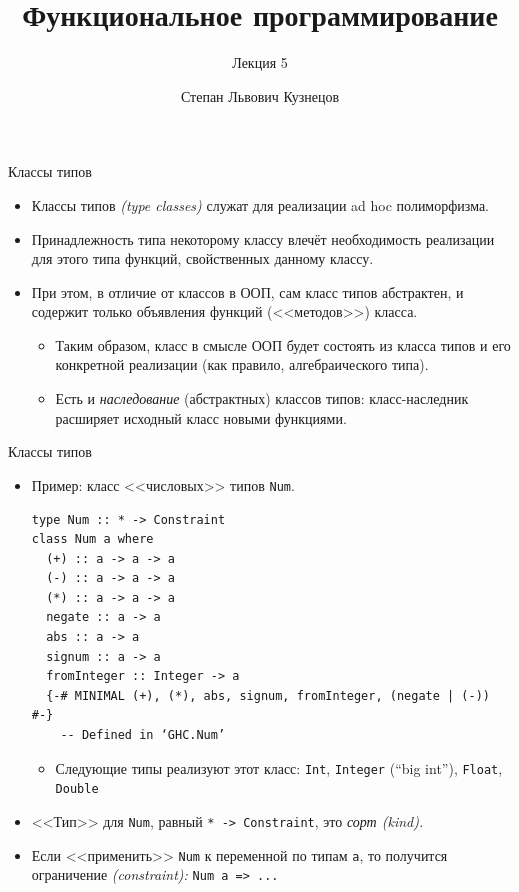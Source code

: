 \documentclass[xcolor=dvipsnames]{beamer}
\begin{document}
\title{Функциональное программирование}
\subtitle{Лекция 5}
\date{}
\author{Степан Львович Кузнецов}

\maketitle

\begin{frame}{Классы типов}
 
 \begin{itemize}[<+->]
  \item Классы типов {\em (type classes)} служат для реализации ad hoc полиморфизма.
  \item Принадлежность типа некоторому классу влечёт необходимость реализации для этого типа функций, свойственных данному классу.
  \item При этом, в отличие от классов в ООП, сам класс типов абстрактен, и содержит только объявления функций (<<методов>>) класса.
  \begin{itemize}
    \item Таким образом, класс в смысле ООП будет состоять из класса типов и его конкретной реализации (как правило, алгебраического типа).
    \item Есть и {\em наследование} (абстрактных) классов типов: класс-наследник расширяет исходный класс новыми функциями.
  \end{itemize}
 \end{itemize}

\end{frame}


\begin{frame}[fragile]{Классы типов}
 
 \begin{itemize}[<+->]
  \item Пример: класс <<числовых>> типов \texttt{Num}.
{\scriptsize
\begin{verbatim}
type Num :: * -> Constraint
class Num a where
  (+) :: a -> a -> a
  (-) :: a -> a -> a
  (*) :: a -> a -> a
  negate :: a -> a
  abs :: a -> a
  signum :: a -> a
  fromInteger :: Integer -> a
  {-# MINIMAL (+), (*), abs, signum, fromInteger, (negate | (-)) #-}
    -- Defined in ‘GHC.Num’
\end{verbatim}
}
\begin{itemize}
  \item Следующие типы реализуют этот класс: \texttt{Int},
  \texttt{Integer} (``big int''), \texttt{Float}, \texttt{Double}
\end{itemize}
 \item {<<Тип>>} для \texttt{Num}, равный \texttt{* -> Constraint}, это {\em сорт (kind).}
 \item Если <<применить>> \texttt{Num} к переменной по типам \texttt{a}, то получится ограничение {\em (constraint):} \texttt{Num a => ...}
 \end{itemize}

\end{frame}
\end{document}

